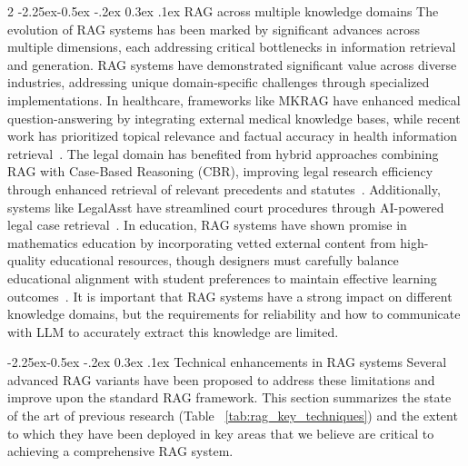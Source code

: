 \documentclass[10pt,letterpaper]{article}
\makeatletter
\let\cite\citep
\renewcommand{\subsection}{\@startsection{subsection}{2}{\z@}%
                                     {-2.25ex\@plus -0.5ex \@minus -.2ex}%
                                     {0.3ex \@plus .1ex}%
                                     {\normalfont\normalsize\itshape\bfseries}}
\makeatother
\begin{document}
\begin{multicols}{2}
\subsection{RAG across multiple knowledge domains}
The evolution of RAG systems has been marked by significant advances across multiple dimensions, each addressing critical bottlenecks in information retrieval and generation. RAG systems have demonstrated significant value across diverse industries, addressing unique domain-specific challenges through specialized implementations. In healthcare, frameworks like MKRAG have enhanced medical question-answering by integrating external medical knowledge bases, while recent work has prioritized topical relevance and factual accuracy in health information retrieval~\cite{shi2023mkrg,upadhyay2025health}. The legal domain has benefited from hybrid approaches combining RAG with Case-Based Reasoning (CBR), improving legal research efficiency through enhanced retrieval of relevant precedents and statutes~\cite{wiratunga2024cbr}. Additionally, systems like LegalAsst have streamlined court procedures through AI-powered legal case retrieval~\cite{han2024legalasst}. In education, RAG systems have shown promise in mathematics education by incorporating vetted external content from high-quality educational resources, though designers must carefully balance educational alignment with student preferences to maintain effective learning outcomes~\cite{levonian2023math}. It is important that RAG systems have a strong impact on different knowledge domains, but the requirements for reliability and how to communicate with LLM to accurately extract this knowledge are limited.

\vspace{-0.5em}
\subsection{Technical enhancements in RAG systems}
Several advanced RAG variants have been proposed to
address these limitations and improve upon the standard RAG framework. This section summarizes the state of the art of previous research (Table ~\ref{tab:rag_key_techniques}) and the extent to which they have been deployed in key areas that we believe are critical to achieving a comprehensive RAG system.


\end{multicols}
\end{document}
